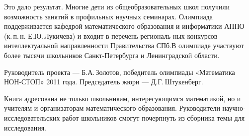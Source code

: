 \ms\abz Это дало результат. Многие дети из общеобразовательных школ получили возможность занятий в профильных научных семинарах. Олимпиада поддерживается кафедрой математического образования и информатики АППО (к.\,п.\,н. Е.Ю.\,Лукичева) и входит в перечень региональ-\linebreak ных конкурсов интеллектуальной направленности Правительства СПб.\linebreak В олимпиаде участвуют более тысячи школьников Санкт-Петербурга и Ленинградской области.

\ms\abz Руководитель проекта — Б.А.\,Золотов, победитель олимпиады «Математика НОН-СТОП» 2011 года. Председатель жюри — Д.Г.\,Штукенберг.   

\ms\abz Книга адресована не только школьникам, интересующимся математикой, но и учителям и организаторам математического образования. Руководители научно-исследовательских работ школьников смогут почерпнуть из сборника темы для исследования. 